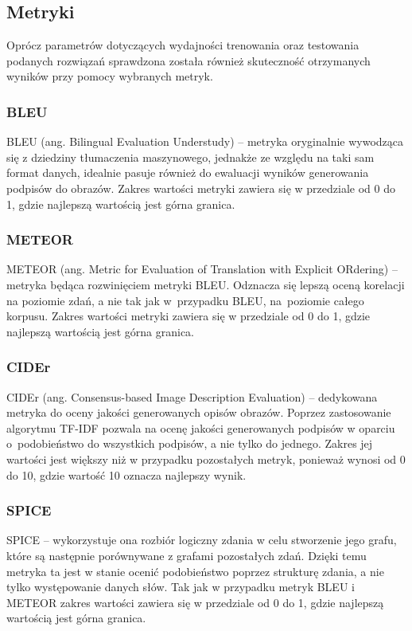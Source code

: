 \subsection{Metryki}
Oprócz parametrów dotyczących wydajności trenowania oraz testowania podanych rozwiązań sprawdzona została również skuteczność otrzymanych wyników przy pomocy wybranych metryk.
\subsubsection{BLEU}
BLEU (ang. Bilingual Evaluation Understudy) \cite{bleu} -- metryka oryginalnie wywodząca się z dziedziny tłumaczenia maszynowego, jednakże ze względu na taki sam format danych, idealnie pasuje również do ewaluacji wyników generowania podpisów do obrazów. Zakres wartości metryki zawiera się w przedziale od 0 do 1, gdzie najlepszą wartością jest górna granica.
\subsubsection{METEOR}
METEOR (ang. Metric for Evaluation of Translation with Explicit ORdering) \cite{meteor} -- metryka będąca rozwinięciem metryki BLEU. Odznacza się lepszą oceną korelacji na poziomie zdań, a nie tak jak w~przypadku BLEU, na~poziomie całego korpusu. Zakres wartości metryki zawiera się w przedziale od 0 do 1, gdzie najlepszą wartością jest górna granica.
\subsubsection{CIDEr}
CIDEr (ang. Consensus-based Image Description Evaluation) \cite{cider} -- dedykowana metryka do oceny jakości generowanych opisów obrazów. Poprzez zastosowanie algorytmu TF-IDF \cite{tfidf} pozwala na ocenę jakości generowanych podpisów w oparciu o~podobieństwo do wszystkich podpisów, a nie tylko do jednego. Zakres jej wartości jest większy niż w przypadku pozostałych metryk, ponieważ wynosi od 0 do 10, gdzie wartość 10 oznacza najlepszy wynik.
\subsubsection{SPICE}
SPICE -- wykorzystuje ona rozbiór logiczny zdania w celu stworzenie jego grafu, które są następnie porównywane z grafami pozostałych zdań. Dzięki temu metryka ta jest w stanie ocenić podobieństwo poprzez strukturę zdania, a nie tylko występowanie danych słów. Tak jak w przypadku metryk BLEU i METEOR zakres wartości zawiera się w przedziale od 0 do 1, gdzie najlepszą wartością jest górna granica.

